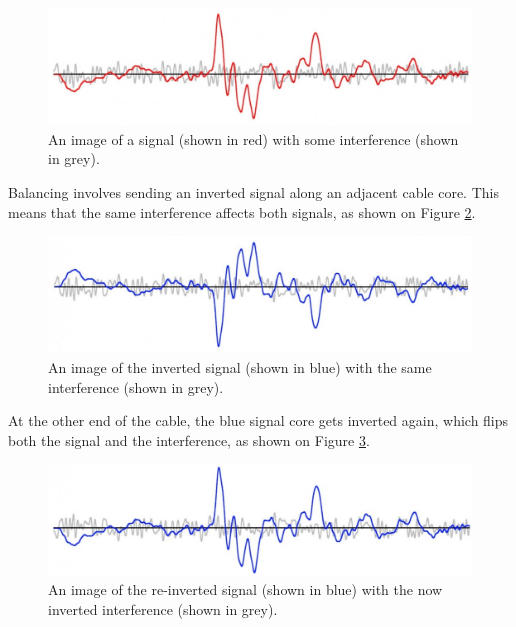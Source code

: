 \documentclass[14pt]{article} %
\begin{document}
\begin{figure}[h]
\begin{center}

\includegraphics[width=18cm]{dirty-signal.png}
\caption{An image of a signal (shown in red) with some interference (shown in grey).}
\label{fig:dirty-signal}

\end{center}
\end{figure}

Balancing involves sending an inverted signal along an adjacent cable core. This means that the same interference affects both signals, as shown on Figure \ref{fig:inverted-signal}.

\begin{figure}[h]
\begin{center}

\includegraphics[width=18cm]{inverted-signal.png}
\caption{An image of the inverted signal (shown in blue) with the same interference (shown in grey).}
\label{fig:inverted-signal}

\end{center}
\end{figure}

At the other end of the cable, the blue signal core gets inverted again, which flips both the signal and the interference, as shown on Figure \ref{fig:second-inverted}.

\begin{figure}[h]
\begin{center}

\includegraphics[width=18cm]{second-inverted.png}
\caption{An image of the re-inverted signal (shown in blue) with the now inverted interference (shown in grey).}
\label{fig:second-inverted}

\end{center}
\end{figure}
\end{document}
